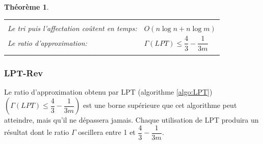 \documentclass[a4paper,12pt]{report}
\theoremstyle{plain}				%
\newtheorem{theoreme}{Théorème}	%
\theoremstyle{definition}				%
\newcommand{\tdi}[1]{\todo[inline]{{#1}}{}}
\newcommand{\lcc}[1]{\todo[author=LCC,color=green,inline]{#1}}
\begin{document}
\begin{theoreme}
\begin{flushleft}
\begin{tabular}{|p{8cm}p{6cm}|}
\hline
& \\
Le tri puis l'affectation coûtent en temps:& $O(n \log n + n \log m)$
\\	%
Le ratio d'approximation:	&	$\Gamma(LPT)\leq \dfrac{4}{3} - \dfrac{1}{3m}$
\\
& \\
\hline
\end{tabular}
\end{flushleft}
\end{theoreme}


\subsubsection{LPT-Rev} %

Le ratio d'approximation obtenu par LPT (algorithme \ref{algo:LPT})
$(\Gamma(LPT)\leq \dfrac{4}{3} - \dfrac{1}{3m})$ est une borne
supérieure que cet algorithme peut atteindre, mais qu'il ne dépassera
jamais.
Chaque utilisation de LPT produira un résultat dont le ratio $\Gamma$
oscillera entre 1 et $\dfrac{4}{3} - \dfrac{1}{3m}$.
\bigskip
\end{document}
